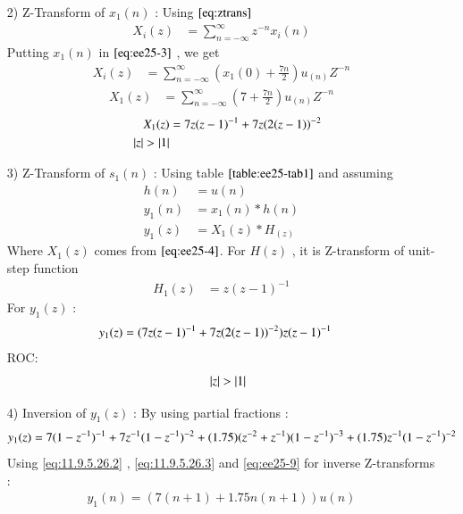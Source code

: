 \documentclass[journal,12pt,onecolumn]{IEEEtran}
\theoremstyle{remark}
\begin{document}
\begin{enumerate}
\item [2)]
Z-Transform of $x_1(n)$ :
Using $\eqref{eq:ztrans}$
\begin{align}
 X_i(z) &= \sum_{n=-\infty}^{\infty} z^{-n}x_i(n) \label{eq:ee25-3}
 \end{align}
Putting $x_1(n)$ in $\eqref{eq:ee25-3}$ , we get 
\begin{align}
     X_i(z) &= \sum_{n=-\infty}^{\infty}(x_1(0) + \frac{7n}{2})u_{(n)}Z^{-n}
\end{align}
\begin{align}
X_1(z) &= \sum_{n=-\infty}^{\infty}(7 + \frac{7n}{2})u_{(n)}Z^{-n} 
\end{align}
\begin{align}
X_1(z) &= 7z(z-1)^{-1} + 7z(2(z-1))^{-2}  \label{eq:ee25-4}\\
\quad \left\vert z\right\vert>\left\vert1\right\vert 
\end{align}
\end{enumerate}
\begin{enumerate}
\item[3)]
Z-Transform of $s_1(n)$ :
Using table $\ref{table:ee25-tab1}$ and assuming 
\begin{align}
         h(n) &= u(n) \\
    y_1(n) &= x_1(n) * h(n) \\
    y_1(z) &= X_1(z) * H_(z)
    \end{align}
    Where $X_1(z)$ comes from $\eqref{eq:ee25-4}$.
    For $H(z)$ , it is Z-transform of unit-step function
    \begin{align}
        H_1(z) &= z(z-1)^{-1} \label{eq:ee25-9}
    \end{align}
    For $y_1(z)$ :
    \begin{align}
y_1(z) &= \notag(7z(z-1)^{-1}+
7z(2(z-1))^{-2})z(z-1)^{-1}
    \end{align}
    ROC:
    \begin{align} 
\quad \left\vert z\right\vert>\left\vert1\right\vert     \end{align}
\end{enumerate}
\begin{enumerate}
        \item[4)]
Inversion of $y_1(z)$ :
By using partial fractions :
\begin{align}
    y_1(z) = \notag7(1-z^{-1})^{-1} + 7z^{-1}(1-z^{-1})^{-2} + (1.75)(z^{-2} + z^{-1})(1-z^{-1})^{-3} + (1.75)z^{-1}(1-z^{-1})^{-2}  
\end{align}
Using \eqref{eq:11.9.5.26.2} , \eqref{eq:11.9.5.26.3} and \eqref{eq:ee25-9} for inverse Z-transforms :
\begin{align}
 y_1(n) = (7(n+1) + 1.75n(n+1))u(n)
\end{align}
\end{enumerate}    
\end{document}
